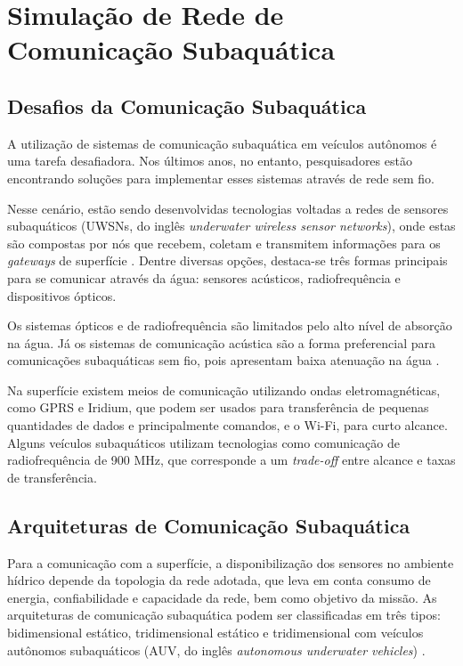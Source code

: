 \section{Simulação de Rede de Comunicação Subaquática}
\label{sec:simulacao-rede-comunicacao-subaquatica}

\subsection{Desafios da Comunicação Subaquática}
\label{subsec:desafios-da-comunicacao-subaquatica}

A utilização de sistemas de comunicação subaquática em veículos autônomos é uma tarefa desafiadora. Nos últimos anos, no entanto, pesquisadores estão encontrando soluções para implementar esses sistemas através de rede sem fio.

Nesse cenário, estão sendo desenvolvidas tecnologias voltadas a redes de sensores subaquáticos (UWSNs, do inglês \textit{underwater wireless sensor networks}), onde estas são compostas por nós que recebem, coletam e transmitem informações para os \textit{gateways} de superfície \cite{godi2021survey}. Dentre diversas opções, destaca-se três formas principais para se comunicar através da água: sensores acústicos, radiofrequência e dispositivos ópticos.

Os sistemas ópticos e de radiofrequência são limitados pelo alto nível de absorção na água. Já os sistemas de comunicação acústica são a forma preferencial para comunicações subaquáticas sem fio, pois apresentam baixa atenuação na água \cite{vieira2010redes}. 

Na superfície existem meios de comunicação utilizando ondas eletromagnéticas, como GPRS e Iridium, que podem ser usados para transferência de pequenas quantidades de dados e principalmente comandos, e o Wi-Fi, para curto alcance. Alguns veículos subaquáticos utilizam tecnologias como comunicação de radiofrequência de 900 MHz, que corresponde a um \textit{trade-off} entre alcance e taxas de transferência.


\subsection{Arquiteturas de Comunicação Subaquática}
\label{subsec:arquiteturas-de-comunicacao-subaquatica}

Para a comunicação com a superfície, a disponibilização dos sensores no ambiente hídrico depende da topologia da rede adotada, que leva em conta consumo de energia, confiabilidade e capacidade da rede, bem como objetivo da missão. As arquiteturas de comunicação subaquática podem ser classificadas em três tipos: bidimensional estático, tridimensional estático e tridimensional com veículos autônomos subaquáticos (AUV, do inglês \textit{autonomous underwater vehicles}) \cite{akyildiz2005underwater}.

